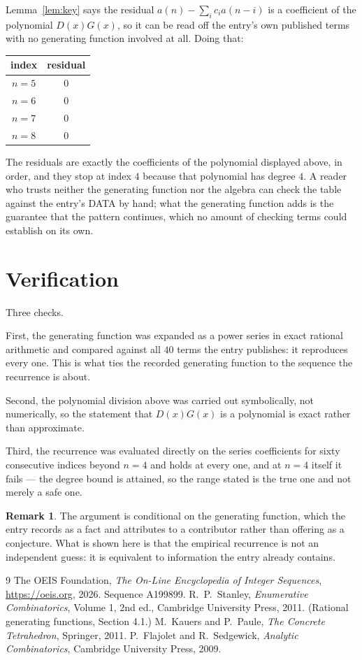 \documentclass[11pt,a4paper]{article}
\theoremstyle{plain}
\theoremstyle{definition}
\newtheorem{remark}[theorem]{Remark}
\begin{document}
Lemma~\ref{lem:key} says the residual $a(n)-\sum_ic_ia(n-i)$ is a coefficient of the
polynomial $D(x)G(x)$, so it can be read off the entry's own published terms with no
generating function involved at all. Doing that:
\begin{center}
\begin{tabular}{cc}
index & residual \\ \hline
$n=5$ & $0$ \\
$n=6$ & $0$ \\
$n=7$ & $0$ \\
$n=8$ & $0$
\end{tabular}
\end{center}
The residuals are exactly the coefficients of the polynomial displayed above, in order, and
they stop at index $4$ because that polynomial has degree $4$. A reader who trusts
neither the generating function nor the algebra can check the table against the entry's DATA
by hand; what the generating function adds is the guarantee that the pattern continues, which
no amount of checking terms could establish on its own.

\section{Verification}

Three checks.

First, the generating function was expanded as a power series in exact rational arithmetic and
compared against all $40$ terms the entry publishes: it reproduces every one. This is
what ties the recorded generating function to the sequence the recurrence is about.

Second, the polynomial division above was carried out symbolically, not numerically, so the
statement that $D(x)G(x)$ is a polynomial is exact rather than approximate.

Third, the recurrence was evaluated directly on the series coefficients for sixty consecutive
indices beyond $n=4$ and holds at every one, and at $n=4$ itself it fails --- the
degree bound is attained, so the range stated is the true one and not merely a safe one.

\begin{remark}
The argument is conditional on the generating function, which the entry records as a fact and
attributes to a contributor rather than offering as a conjecture. What is shown here is that
the empirical recurrence is not an independent guess: it is equivalent to information the
entry already contains.
\end{remark}

\begin{thebibliography}{9}
 The OEIS Foundation, \emph{The On-Line Encyclopedia of Integer
Sequences}, \url{https://oeis.org}, 2026. Sequence A199899.
 R.~P.~Stanley, \emph{Enumerative Combinatorics}, Volume 1, 2nd ed.,
Cambridge University Press, 2011. (Rational generating functions, Section 4.1.)
 M.~Kauers and P.~Paule, \emph{The Concrete Tetrahedron}, Springer, 2011.
 P.~Flajolet and R.~Sedgewick, \emph{Analytic Combinatorics}, Cambridge
University Press, 2009.
\end{thebibliography}
\end{document}
